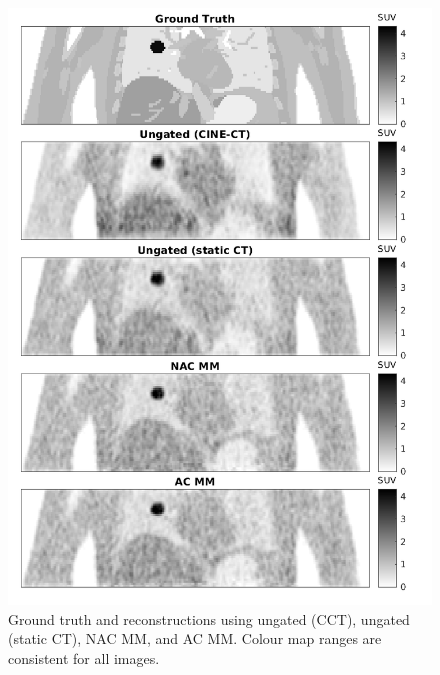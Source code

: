             \begin{figure}
                \centering
                
                \includegraphics[width=1.0\linewidth]{figures/motion_correction_1_results_2_visual_analysis.png}
                
                \captionsetup{singlelinecheck=false}
                \caption{
                    Ground truth and reconstructions using ungated (\gls{CCT}), ungated (static \gls{CT}), \gls{NAC} \gls{MM}, and \gls{AC} \gls{MM}. Colour map ranges are consistent for all images.
                }
                \label{fig:pet_ct_respiratory_motion_correction_with_a_single_attenuation_map_using_nac_derived_deformation_fields_results_visual_analysis}
            \end{figure}
            
